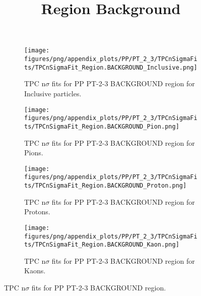             \begin{figure}[H]
                \title{Region Background}
                \begin{subfigure}[b]{0.5\textwidth}
                    \centering
                    \texttt{[image: figures/png/appendix\_plots/PP/PT\_2\_3/TPCnSigmaFits/TPCnSigmaFit\_Region.BACKGROUND\_Inclusive.png]}
                    \caption{TPC n$\sigma$ fits for PP PT-2-3 BACKGROUND region for Inclusive particles.}
                    \label{fig:appendix_PP_PT-2-3_BACKGROUND_Inclusive}
                \end{subfigure}
                \begin{subfigure}[b]{0.5\textwidth}
                    \centering
                    \texttt{[image: figures/png/appendix\_plots/PP/PT\_2\_3/TPCnSigmaFits/TPCnSigmaFit\_Region.BACKGROUND\_Pion.png]}
                    \caption{TPC n$\sigma$ fits for PP PT-2-3 BACKGROUND region for Pions.}
                    \label{fig:appendix_PP_PT-2-3_BACKGROUND_Pion}
                \end{subfigure}
                \begin{subfigure}[b]{0.5\textwidth}
                    \centering
                    \texttt{[image: figures/png/appendix\_plots/PP/PT\_2\_3/TPCnSigmaFits/TPCnSigmaFit\_Region.BACKGROUND\_Proton.png]}
                    \caption{TPC n$\sigma$ fits for PP PT-2-3 BACKGROUND region for Protons.}
                    \label{fig:appendix_PP_PT-2-3_BACKGROUND_Proton}
                \end{subfigure}
                \begin{subfigure}[b]{0.5\textwidth}
                    \centering
                    \texttt{[image: figures/png/appendix\_plots/PP/PT\_2\_3/TPCnSigmaFits/TPCnSigmaFit\_Region.BACKGROUND\_Kaon.png]}
                    \caption{TPC n$\sigma$ fits for PP PT-2-3 BACKGROUND region for Kaons.}
                    \label{fig:appendix_PP_PT-2-3_BACKGROUND_Kaon}
                \end{subfigure}
                \caption{TPC n$\sigma$ fits for PP PT-2-3 BACKGROUND region.}
                \label{fig:appendix_PP_PT-2-3_BACKGROUND}
            \end{figure}
            \clearpage
            
    
